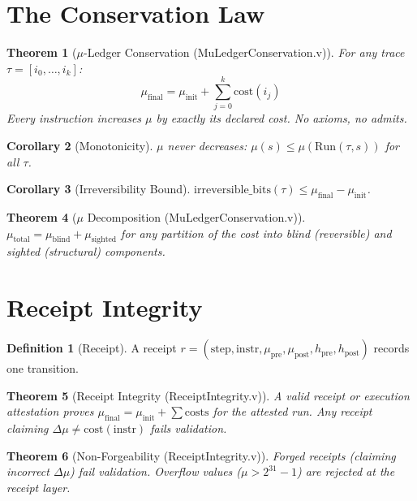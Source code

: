 \documentclass[11pt, a4paper]{report}
\theoremstyle{definition}
\newtheorem{definition}{Definition}[chapter]
\theoremstyle{plain}
\newtheorem{theorem}{Theorem}[chapter]
\newtheorem{corollary}[theorem]{Corollary}
\begin{document}
\section{The Conservation Law}

\begin{theorem}[$\mu$-Ledger Conservation {\normalfont (MuLedgerConservation.v)}]
For any trace $\tau = [i_0, \dots, i_k]$:
\[ \mu_{\mathrm{final}} = \mu_{\mathrm{init}} + \sum_{j=0}^{k} \mathrm{cost}(i_j) \]
Every instruction increases $\mu$ by exactly its declared cost. No axioms, no admits.
\end{theorem}

\begin{corollary}[Monotonicity]
$\mu$ never decreases: $\mu(s) \le \mu(\mathrm{Run}(\tau, s))$ for all $\tau$.
\end{corollary}

\begin{corollary}[Irreversibility Bound]
$\mathrm{irreversible\_bits}(\tau) \le \mu_{\mathrm{final}} - \mu_{\mathrm{init}}$.
\end{corollary}

\begin{theorem}[$\mu$ Decomposition {\normalfont (MuLedgerConservation.v)}]
$\mu_{\mathrm{total}} = \mu_{\mathrm{blind}} + \mu_{\mathrm{sighted}}$ for any partition of the cost into blind (reversible) and sighted (structural) components.
\end{theorem}

\section{Receipt Integrity}

\begin{definition}[Receipt]
A receipt $r = (\mathrm{step}, \mathrm{instr}, \mu_{\mathrm{pre}}, \mu_{\mathrm{post}}, h_{\mathrm{pre}}, h_{\mathrm{post}})$ records one transition.
\end{definition}

\begin{theorem}[Receipt Integrity {\normalfont (ReceiptIntegrity.v)}]
A valid receipt or execution attestation proves $\mu_{\mathrm{final}} = \mu_{\mathrm{init}} + \sum \mathrm{costs}$ for the attested run. Any receipt claiming $\Delta\mu \neq \mathrm{cost}(\mathrm{instr})$ fails validation.
\end{theorem}

\begin{theorem}[Non-Forgeability {\normalfont (ReceiptIntegrity.v)}]
Forged receipts (claiming incorrect $\Delta\mu$) fail validation. Overflow values ($\mu > 2^{31}-1$) are rejected at the receipt layer.
\end{theorem}
\end{document}
